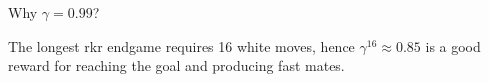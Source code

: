 \begin{frame}
  Why $\gamma=0.99$?
  
  The longest rkr endgame requires 16 white moves, hence $\gamma^{16} \approx 0.85$ is a good reward for reaching the goal and producing fast mates.
\end{frame}

